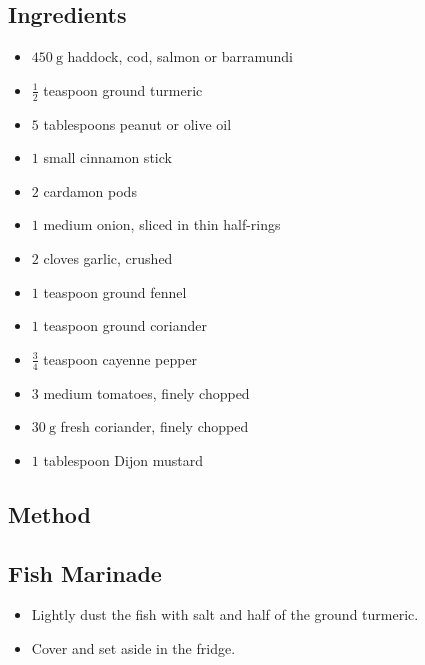 \documentclass[11pt,a4paper]{article}
\begin{document}
\subsection*{Ingredients}

\begin{multicols}{2}

\begin{itemize}
  \item $ \qty{450}{\gram} $ haddock, cod, salmon or barramundi
  \item $ \frac{1}{2} $ teaspoon ground turmeric
  \item $ 5 $ tablespoons peanut or olive oil
  \item $ 1 $ small cinnamon stick
  \item $ 2 $ cardamon pods
  \item $ 1 $ medium onion, sliced in thin half-rings
  \item $ 2 $ cloves garlic, crushed
\end{itemize}

\columnbreak{}

\begin{itemize}
  \item $ 1 $ teaspoon ground fennel
  \item $ 1 $ teaspoon ground coriander
  \item $ \frac{3}{4} $ teaspoon cayenne pepper
  \item $ 3 $ medium tomatoes, finely chopped
  \item $ \qty{30}{\gram} $ fresh coriander, finely chopped
  \item $ 1 $ tablespoon Dijon mustard
\end{itemize}

\end{multicols}

\medskip

\subsection*{Method}

\subsection*{Fish Marinade}

\begin{itemize}
  \item Lightly dust the fish with salt and half of the ground turmeric. 
  \item Cover and set aside in the fridge.
\end{itemize}
  
\end{document}
